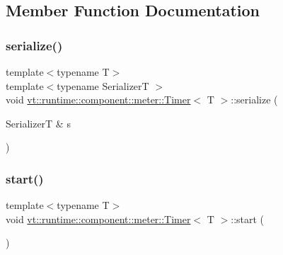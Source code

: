 \subsection{Member Function Documentation}
\mbox{\label{structvt_1_1runtime_1_1component_1_1meter_1_1_timer_a4462112eaf78f9dec18de88d9c4c93f4}} 
\subsubsection{\texorpdfstring{serialize()}{serialize()}}
{\footnotesize\ttfamily template$<$typename T$>$ \\
template$<$typename SerializerT $>$ \\
void \hyperlink{structvt_1_1runtime_1_1component_1_1meter_1_1_timer}{vt\+::runtime\+::component\+::meter\+::\+Timer}$<$ T $>$\+::serialize (\begin{DoxyParamCaption}\item[{SerializerT \&}]{s }\end{DoxyParamCaption})\hspace{0.3cm}{\ttfamily [inline]}}

\mbox{\label{structvt_1_1runtime_1_1component_1_1meter_1_1_timer_a685bd06e9e97de01cf8948dec7d59462}} 
\subsubsection{\texorpdfstring{start()}{start()}}
{\footnotesize\ttfamily template$<$typename T$>$ \\
void \hyperlink{structvt_1_1runtime_1_1component_1_1meter_1_1_timer}{vt\+::runtime\+::component\+::meter\+::\+Timer}$<$ T $>$\+::start (\begin{DoxyParamCaption}{ }\end{DoxyParamCaption})\hspace{0.3cm}{\ttfamily [inline]}}



